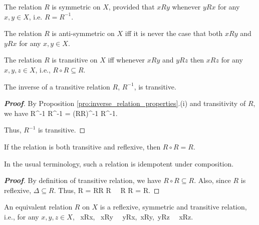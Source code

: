\begin{definition}
The relation $R$ is symmetric on $X$, provided that $xRy$ whenever $yRx$ for any $x,y\in X$, i.e. $R = R^{-1}$.
\end{definition}

\begin{definition}
The relation $R$ is anti-symmetric on $X$ iff it is never the case that both $xRy$ and $yRx$ for any $x,y\in X$.
\end{definition}


\begin{definition}
The relation $R$ is transitive on $X$ iff whenever $xRy$ and $yRz$ then $xRz$ for any $x,y,z\in X$, i.e., $R\circ R\subseteq R$.
\end{definition}

\begin{proposition}\label{pro:inverse_of_transitive_relation}
The inverse of a transitive relation $R$, $R^{-1}$, is transitive.
\end{proposition}

\begin{proof}[\bf Proof]
By Proposition \ref{pro:inverse_relation_properties}.(i) and transitivity of $R$, we have
\be
R^{-1} \circ R^{-1} = (R\circ R)^{-1} \subseteq R^{-1}.
\ee

Thus, $R^{-1}$ is transitive.
\end{proof}

\begin{proposition}
If the relation is both transitive and reflexive, then $R\circ R = R$.
\end{proposition}

\begin{remark}
In the usual terminology, such a relation is idempotent under composition.
\end{remark}

\begin{proof}[\bf Proof]
By definition of transitive relation, we have $R\circ R \subseteq R$. Also, since $R$ is reflexive, $\Delta \subseteq R$. Thus,
\be
R = R\circ \Delta \subseteq R \circ R \ \ra \ R \circ R = R.
\ee
\end{proof}





\begin{definition}
An equivalent relation $R$ on $X$ is a reflexive, symmetric and transitive relation, i.e., for any $x,y,z\in X$,
\be
{}\ xRx, \qquad {}\ xRy \ \ra \ yRx,\qquad {}\  xRy,\ yRz \ \ra \ xRz.
\ee
\end{definition}




